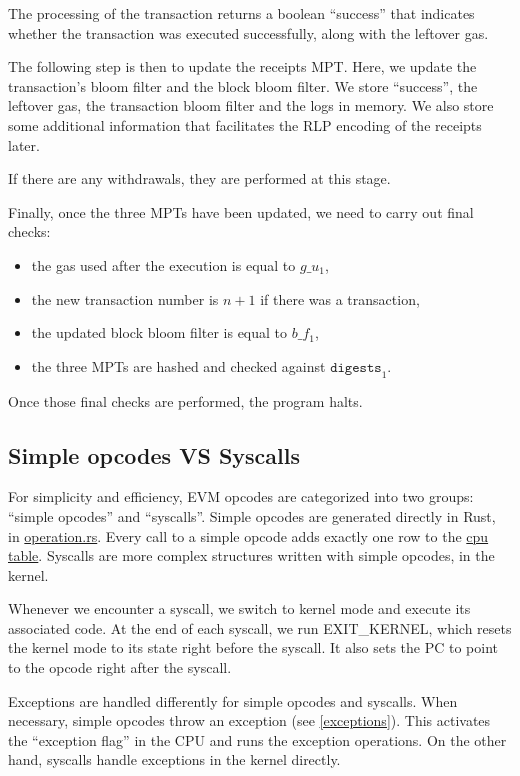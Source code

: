 The processing of the transaction returns a boolean ``success'' that indicates whether the transaction was executed successfully, along with the leftover gas. 

The following step is then to update the receipts MPT. Here, we update the transaction's bloom filter and the block bloom filter. We store ``success'', the leftover gas, the transaction bloom filter and the logs in memory. We also store some additional information that facilitates the RLP encoding of the receipts later.

If there are any withdrawals, they are performed at this stage.

Finally, once the three MPTs have been updated, we need to carry out final checks:
\begin{itemize}
    \item the gas used after the execution is equal to $g\_u_1$,
    \item the new transaction number is $n+1$ if there was a transaction,
    \item the updated block bloom filter is equal to $b\_f_1$,
    \item the three MPTs are hashed and checked against $\texttt{digests}_1$.
\end{itemize}
Once those final checks are performed, the program halts.

\subsection{Simple opcodes VS Syscalls}
For simplicity and efficiency, EVM opcodes are categorized into two groups: ``simple opcodes'' and ``syscalls''. Simple opcodes are generated directly in Rust, in \href{https://github.com/0xPolygonZero/plonky2/blob/main/evm/src/witness/operation.rs}{operation.rs}. Every call to a simple opcode adds exactly one row to the \href{https://github.com/0xPolygonZero/plonky2/blob/main/evm/spec/tables/cpu.tex}{cpu table}. Syscalls are more complex structures written with simple opcodes, in the kernel.

Whenever we encounter a syscall, we switch to kernel mode and execute its associated code. At the end of each syscall, we run EXIT\_KERNEL, which resets the kernel mode to its state right before the syscall. It also sets the PC to point to the opcode right after the syscall.

Exceptions are handled differently for simple opcodes and syscalls. When necessary, simple opcodes throw an exception (see \ref{exceptions}). This activates the ``exception flag'' in the CPU and runs the exception operations. On the other hand, syscalls handle exceptions in the kernel directly.

